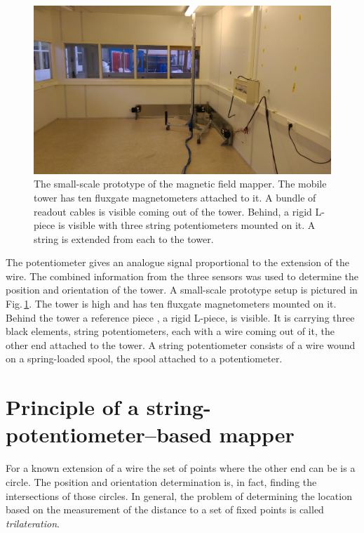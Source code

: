 \begin{figure}
  \centering
  \includegraphics[width=\linewidth]{gfx/mapping/lpsc/setup.jpg}
  \caption{The small-scale prototype of the magnetic field mapper. The mobile tower has ten fluxgate magnetometers attached to it. A bundle of readout cables is visible coming out of the tower. Behind, a rigid L-piece is visible with three string potentiometers mounted on it. A string is extended from each to the tower. }\label{fig:mapping_bastille_setup}
\end{figure}

 The potentiometer gives an analogue signal proportional to the extension of the wire. The combined information from the three sensors was used to determine the position and orientation of the tower.
A small-scale prototype setup is pictured in Fig.\,\ref{fig:mapping_bastille_setup}. The tower is  high and has ten fluxgate magnetometers mounted on it. Behind the tower a reference piece , a rigid L-piece, is visible. 
It is carrying three black elements, string potentiometers, each with a wire coming out of it, the other end attached to the tower. A string potentiometer consists of a wire wound on a spring-loaded spool, the spool attached to a potentiometer.



\section{Principle of a string-potentiometer--based mapper}
For a known extension of a wire the set of points where the other end can be is a circle. The position and orientation determination is, in fact, finding the intersections of those circles.
In general, the problem of determining the location based on the measurement of the distance to a set of fixed points is called \emph{trilateration}.

